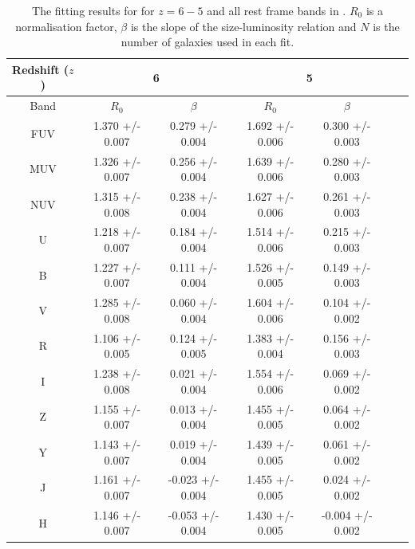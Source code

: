 \begin{table}
\begin{center}
\begin{tabular}{ c | c | c | c | c | c | c}
 \hline
 Redshift ($z$) & \multicolumn{2}{|c|}{6} & \multicolumn{2}{|c|}{5} \\ \hline
 Band & $R_0$ & $\beta$ & $R_0$ & $\beta$ \\ \hline
 FUV 
 & 1.370 +/- 0.007 & 0.279 +/- 0.004 
 & 1.692 +/- 0.006 & 0.300 +/- 0.003 \\
 MUV 
 & 1.326 +/- 0.007 & 0.256 +/- 0.004
 & 1.639 +/- 0.006 & 0.280 +/- 0.003 \\
 NUV 
 & 1.315 +/- 0.008 & 0.238 +/- 0.004
 & 1.627 +/- 0.006 & 0.261 +/- 0.003 \\
 U 
 & 1.218 +/- 0.007 & 0.184 +/- 0.004
 & 1.514 +/- 0.006 & 0.215 +/- 0.003 \\
 B 
 & 1.227 +/- 0.007 & 0.111 +/- 0.004 
 & 1.526 +/- 0.005 & 0.149 +/- 0.003 \\
 V 
 & 1.285 +/- 0.008 & 0.060 +/- 0.004 
 & 1.604 +/- 0.006 & 0.104 +/- 0.002 \\
 R
 & 1.106 +/- 0.005 & 0.124 +/- 0.005 
 & 1.383 +/- 0.004 & 0.156 +/- 0.003 \\
 I
 & 1.238 +/- 0.008 & 0.021 +/- 0.004 
 & 1.554 +/- 0.006 & 0.069 +/- 0.002 \\
 Z
 & 1.155 +/- 0.007 & 0.013 +/- 0.004 
 & 1.455 +/- 0.005 & 0.064 +/- 0.002 \\
 Y
 & 1.143 +/- 0.007 & 0.019 +/- 0.004 
 & 1.439 +/- 0.005 & 0.061 +/- 0.002 \\
 J
 & 1.161 +/- 0.007 & -0.023 +/- 0.004 
 & 1.455 +/- 0.005 & 0.024 +/- 0.002 \\
 H
 & 1.146 +/- 0.007 & -0.053 +/- 0.004
 & 1.430 +/- 0.005 & -0.004 +/- 0.002 \\
 \hline
\end{tabular}
\caption{The fitting results for  for $z=6-5$ and all rest frame bands in . $R_0$ is a normalisation factor, $\beta$ is the slope of the size-luminosity relation and $N$ is the number of galaxies used in each fit.}
\label{tab:colorrfit2}
\end{center}
\end{table}